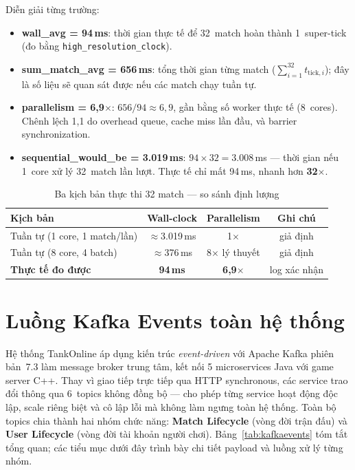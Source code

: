 \documentclass[12pt,a4paper]{report}
\begin{document}
\noindent Diễn giải từng trường:
\begin{itemize}
  \item \textbf{wall\_avg = 94\,ms}: thời gian thực tế để 32~match hoàn
        thành 1~super-tick (đo bằng \texttt{high\_resolution\_clock}).
  \item \textbf{sum\_match\_avg = 656\,ms}: tổng thời gian từng match
        ($\sum_{i=1}^{32} t_{\text{tick},i}$); đây là số liệu sẽ quan sát
        được nếu các match chạy tuần tự.
  \item \textbf{parallelism = 6{,}9$\times$}: $656/94 \approx 6{,}9$,
        gần bằng số worker thực tế (8~cores). Chênh lệch 1,1 do overhead
        queue, cache miss lần đầu, và barrier synchronization.
  \item \textbf{sequential\_would\_be = 3.019\,ms}: $94 \times 32 = 3.008$\,ms
        --- thời gian nếu 1~core xử lý 32~match lần lượt.
        Thực tế chỉ mất 94\,ms, nhanh hơn \textbf{32$\times$}.
\end{itemize}

\begin{table}[H]
\centering
\caption{Ba kịch bản thực thi 32 match --- so sánh định lượng}
\label{tab:concurrent_scenarios}
\begin{tabular}{lccc}
\toprule
\textbf{Kịch bản} & \textbf{Wall-clock} & \textbf{Parallelism} & \textbf{Ghi chú} \\
\midrule
Tuần tự (1 core, 1 match/lần) & $\approx$3.019\,ms & 1$\times$ & giả định \\
Tuần tự (8 core, 4 batch)     & $\approx$376\,ms   & 8$\times$ lý thuyết & giả định \\
\textbf{Thực tế đo được}      & \textbf{94\,ms}    & \textbf{6{,}9$\times$} & log xác nhận \\
\bottomrule
\end{tabular}
\end{table}

\FloatBarrier
\section{Luồng Kafka Events toàn hệ thống}

Hệ thống TankOnline áp dụng kiến trúc \textit{event-driven} với Apache Kafka phiên bản~7.3
làm message broker trung tâm, kết nối 5 microservices Java với game server C++. Thay vì
giao tiếp trực tiếp qua HTTP synchronous, các service trao đổi thông qua 6~topics không
đồng bộ --- cho phép từng service hoạt động độc lập, scale riêng biệt và cô lập lỗi mà
không làm ngưng toàn hệ thống. Toàn bộ topics chia thành hai nhóm chức năng: \textbf{Match
Lifecycle} (vòng đời trận đấu) và \textbf{User Lifecycle} (vòng đời tài khoản người chơi).
Bảng~\ref{tab:kafkaevents} tóm tắt tổng quan; các tiểu mục dưới đây trình bày chi tiết
payload và luồng xử lý từng nhóm.
\end{document}
